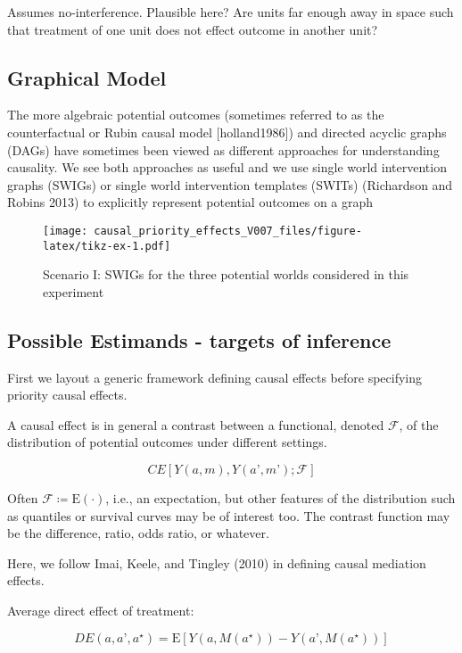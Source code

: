 \documentclass[]{article}
\begin{document}
Assumes no-interference. Plausible here? Are units far enough away in
space such that treatment of one unit does not effect outcome in another
unit?

\hypertarget{graphical-model}{%
\subsection{Graphical Model}\label{graphical-model}}

The more algebraic potential outcomes (sometimes referred to as the
counterfactual or Rubin causal model {[}holland1986{]}) and directed
acyclic graphs (DAGs) have sometimes been viewed as different approaches
for understanding causality. We see both approaches as useful and we use
single world intervention graphs (SWIGs) or single world intervention
templates (SWITs) (Richardson and Robins 2013) to explicitly represent
potential outcomes on a graph

\begin{figure}
\centering
\texttt{[image: causal\_priority\_effects\_V007\_files/figure-latex/tikz-ex-1.pdf]}
\caption{Scenario I: SWIGs for the three potential worlds considered in
this experiment}
\end{figure}

\hypertarget{possible-estimands---targets-of-inference}{%
\subsection{Possible Estimands - targets of
inference}\label{possible-estimands---targets-of-inference}}

First we layout a generic framework defining causal effects before
specifying priority causal effects.

A causal effect is in general a contrast between a functional, denoted
\(\mathcal{F}\), of the distribution of potential outcomes under
different settings.

\[
CE[Y(a, m), Y(a’, m’); \mathcal{F}]
\]

Often \(\mathcal{F} \coloneqq \mathrm{E}(\cdot)\), i.e., an expectation,
but other features of the distribution such as quantiles or survival
curves may be of interest too. The contrast function may be the
difference, ratio, odds ratio, or whatever.

Here, we follow Imai, Keele, and Tingley (2010) in defining causal
mediation effects.

Average direct effect of treatment:

\[
DE(a, a’, a^{\star}) = \mathrm{E}[Y(a, M(a^{\star})) - Y(a’, M(a^{\star}))]
\]
\end{document}
